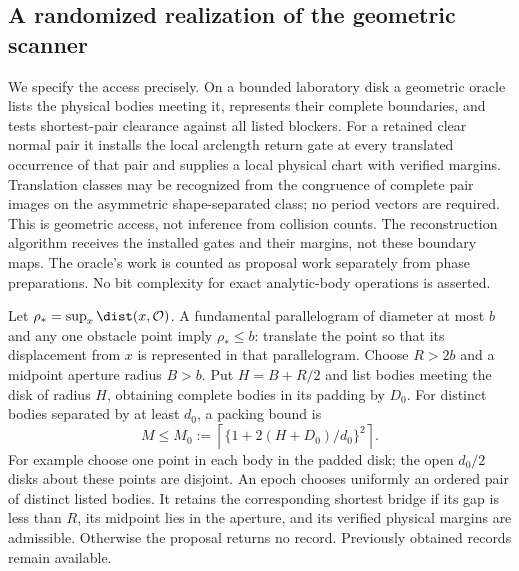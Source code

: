 \subsection{A randomized realization of the geometric scanner}
We specify the access precisely. On a bounded laboratory disk a geometric
oracle lists the physical bodies meeting it, represents their complete
boundaries, and tests shortest-pair clearance against all listed blockers.
For a retained clear normal pair it installs the local arclength return
gate at every translated occurrence of that pair and supplies a local
physical chart with verified margins. Translation classes may be recognized
from the congruence of complete pair images on the asymmetric
shape-separated class; no period vectors are required. This is geometric
access, not inference from collision counts. The reconstruction algorithm
receives the installed gates and their margins, not these boundary maps.
The oracle's work is counted as proposal work separately from phase
preparations. No bit complexity for exact analytic-body operations is asserted.

Let $\rho_* =\sup_x\dist(x,\mathcal O)$. A fundamental parallelogram
of diameter at most $b$ and any one obstacle point imply $\rho_*\le b$:
translate the point so that its displacement from $x$ is represented in
that parallelogram. Choose $R>2b$ and a midpoint aperture radius $B>b$.
Put $H=B+R/2$ and list bodies meeting the disk of radius $H$, obtaining
complete bodies in its padding by $D_0$. For distinct bodies separated
by at least $d_0$, a packing bound is
\begin{equation}\label{eq:body-count}
 M\le M_0:=\left\lceil\{1+2(H+D_0)/d_0\}^2\right\rceil.
\end{equation}
For example choose one point in each body in the padded disk; the open
$d_0/2$ disks about these points are disjoint. An epoch chooses uniformly
an ordered pair of distinct listed bodies. It retains the corresponding
shortest bridge if its gap is less than $R$, its midpoint lies in the
aperture, and its verified physical margins are admissible. Otherwise the
proposal returns no record. Previously obtained records remain available.

